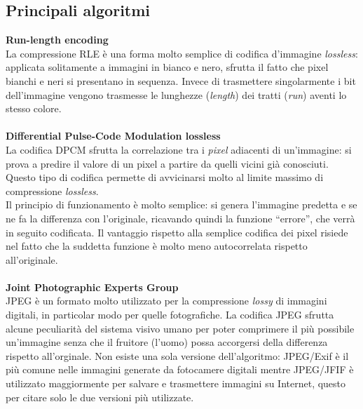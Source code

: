\subsection{Principali algoritmi}
  \textbf{Run-length encoding} \\
  La compressione RLE è una forma molto semplice di codifica d'immagine 
  \emph{lossless}: applicata solitamente a immagini in bianco e nero, sfrutta 
  il fatto che pixel bianchi e neri si presentano in sequenza. Invece di 
  trasmettere singolarmente i bit dell'immagine vengono trasmesse le lunghezze 
  (\emph{length}) dei tratti (\emph{run}) aventi lo stesso colore.
  \\ \\
  \textbf{Differential Pulse-Code Modulation lossless} \\
  La codifica DPCM sfrutta la correlazione tra i \emph{pixel} adiacenti di 
  un'immagine: si prova a predire il valore di un pixel a partire da quelli 
  vicini già conosciuti. Questo tipo di codifica permette di avvicinarsi molto 
  al limite massimo di compressione \emph{lossless}.\\
  Il principio di funzionamento è molto semplice: si genera l'immagine predetta 
  e se ne fa la differenza con l'originale, ricavando quindi la funzione 
  ``errore'', che verrà in seguito codificata. Il vantaggio rispetto alla 
  semplice codifica dei pixel risiede nel fatto che la suddetta funzione è molto
  meno autocorrelata rispetto all'originale.
  \\ \\
  \textbf{Joint Photographic Experts Group} \\
  JPEG è un formato molto utilizzato per la compressione \emph{lossy} di 
  immagini digitali, in particolar modo per quelle fotografiche. La codifica 
  JPEG sfrutta alcune peculiarità del sistema visivo umano per poter comprimere 
  il più possibile un'immagine senza che il fruitore (l'uomo) possa accorgersi 
  della differenza rispetto all'orginale. Non esiste una sola versione 
  dell'algoritmo: JPEG/Exif è il più comune nelle immagini generate da 
  fotocamere digitali mentre JPEG/JFIF è utilizzato maggiormente per salvare e 
  trasmettere immagini su Internet, questo per citare solo le due versioni più 
  utilizzate.



